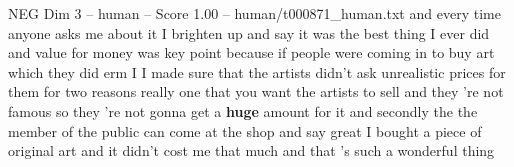 \begin{textsample}{NEG Dim 3 – human – Score 1.00 – human/t000871\_human.txt}  \label{ex:f3_neg_038}
and every time anyone asks me about it I brighten up and say it was the best thing I ever did and value for money was key point because if people were coming in to buy art which they did erm I I made sure that the artists didn't ask unrealistic prices for them for two reasons really one that you want the artists to sell and they 're not famous so they 're not gonna get a \textbf{huge} amount for it and secondly the the member of the public can come at the shop and say great I bought a piece of original art and it didn't cost me that much and that 's such a wonderful thing

\end{textsample}
